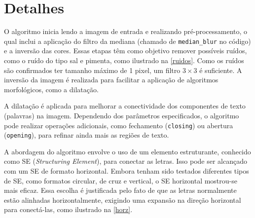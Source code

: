 \documentclass[english, 
               brazil, 
               bsc] %
               {dcomp-abntex2}
\begin{document}


\section{Detalhes} 

O algoritmo inicia lendo a imagem de entrada e realizando pré-processamento, o qual inclui a aplicação do filtro da mediana (chamado de \texttt{median\_blur} no código) e a inversão das cores. Essas etapas têm como objetivo remover possíveis ruídos, como o ruído do tipo sal e pimenta, como ilustrado na \autoref{ruidos}. Como os ruídos são confirmados ter tamanho máximo de 1 pixel, um filtro $3 \times 3$ é suficiente. A inversão da imagem é realizada para facilitar a aplicação de algoritmos morfológicos, como a dilatação.

A dilatação é aplicada para melhorar a conectividade dos componentes de texto (palavras) na imagem. Dependendo dos parâmetros especificados, o algoritmo pode realizar operações adicionais, como fechamento (\texttt{closing}) ou abertura (\texttt{opening}), para refinar ainda mais as regiões de texto.

A abordagem do algoritmo envolve o uso de um elemento estruturante, conhecido como SE (\textit{Structuring Element}), para conectar as letras. Isso pode ser alcançado com um SE de formato horizontal. Embora tenham sido testados diferentes tipos de SE, como formatos circular, de cruz e vertical, o SE horizontal mostrou-se mais eficaz. Essa escolha é justificada pelo fato de que as letras normalmente estão alinhadas horizontalmente, exigindo uma expansão na direção horizontal para conectá-las, como ilustrado na \autoref{horz}.

\end{document}
